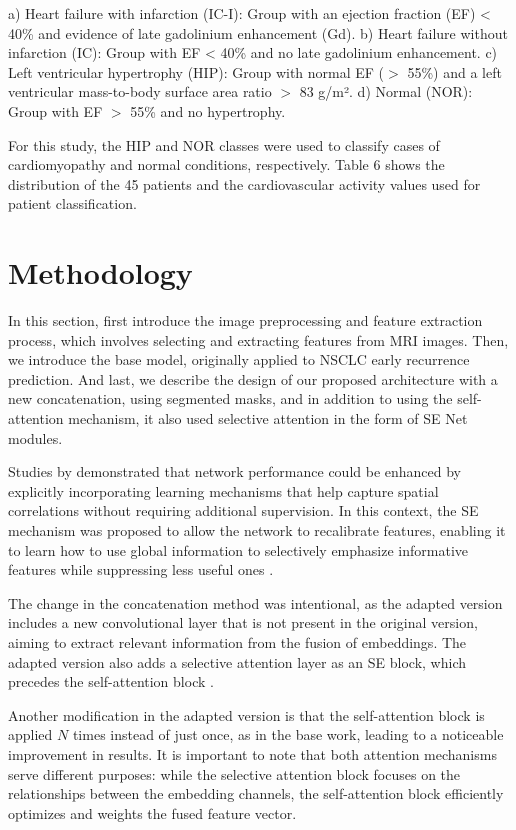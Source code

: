 \documentclass[journal,twoside,web]{ieeecolor}
\begin{document}
a) Heart failure with infarction (IC-I): Group with an ejection fraction (EF) < 40\% and evidence of late gadolinium enhancement (Gd).  
b) Heart failure without infarction (IC): Group with EF < 40\% and no late gadolinium enhancement.  
c) Left ventricular hypertrophy (HIP): Group with normal EF ($>$ 55\%) and a left ventricular mass-to-body surface area ratio $>$ 83 g/m².  
d) Normal (NOR): Group with EF $>$ 55\% and no hypertrophy.  

For this study, the HIP and NOR classes were used to classify cases of cardiomyopathy and normal conditions, respectively. Table 6 shows the distribution of the 45 patients and the cardiovascular activity values used for patient classification.

\section{Methodology}

In this section, first introduce the image preprocessing and feature extraction process, which involves selecting and extracting features from \gls{MRI} images. Then, we introduce the base model, originally applied to \gls{NSCLC} early recurrence prediction. And last, we describe the design of our proposed architecture with a new concatenation, using segmented masks, and in addition to using the self-attention mechanism, it also used selective attention in the form of \gls{SE} Net modules. 

Studies by \cite{huSqueezeandExcitationNetworks2018} demonstrated that network performance could be enhanced by explicitly incorporating learning mechanisms that help capture spatial correlations without requiring additional supervision.  In this context, the \gls{SE} mechanism was proposed to allow the network to recalibrate features, enabling it to learn how to use global information to selectively emphasize informative features while suppressing less useful ones \cite{lecunHandwrittenDigitRecognition1989}.

The change in the concatenation method was intentional, as the adapted version includes a new convolutional layer that is not present in the original version, aiming to extract relevant information from the fusion of embeddings. The adapted version also adds a selective attention layer as an \gls{SE} block, which precedes the self-attention block \cite{osheaIntroductionConvolutionalNeural2015c}.  

Another modification in the adapted version is that the self-attention block is applied $N$ times instead of just once, as in the base work, leading to a noticeable improvement in results. It is important to note that both attention mechanisms serve different purposes: while the selective attention block focuses on the relationships between the embedding channels, the self-attention block efficiently optimizes and weights the fused feature vector.  
\end{document}
